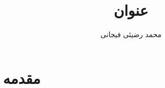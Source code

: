 \documentclass[12pt]{book}
\title{عنوان}
\author{محمد رضیئی فیجانی}
\begin{document}
\maketitle
\tableofcontents
\chapter{مقدمه}\label{chpt1}
\end{document}
